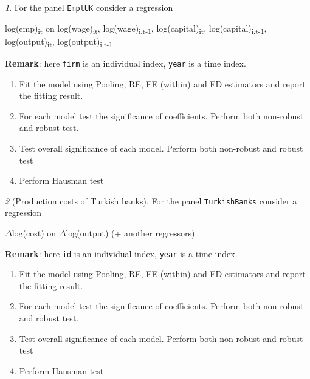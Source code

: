 \documentclass[12pt]{article}
\theoremstyle{remark}
\newtheorem{exercise}{}[section]
\begin{document}
\begin{exercise}
For the panel \texttt{EmplUK} consider a regression
\begin{center}
	log(emp)\textsubscript{it} on log(wage)\textsubscript{it}, log(wage)\textsubscript{i,t-1}, 
	log(capital)\textsubscript{it}, log(capital)\textsubscript{i,t-1},
	log(output)\textsubscript{it}, log(output)\textsubscript{i,t-1}  
\end{center}
\textbf{Remark}: here \texttt{firm} is an individual index, 
\texttt{year} is a time index.
\begin{enumerate}
	\item Fit the model using Pooling, RE, FE (within) and FD estimators
	and report the fitting result.
	\item For each model test the significance of coefficients. Perform both
	non-robust and robust test.
	\item Test overall significance of each model. Perform both
	non-robust and robust test
	\item Perform Hausman test
\end{enumerate}
\end{exercise}

\begin{exercise}[Production costs of Turkish banks]
For the panel \texttt{TurkishBanks} consider a regression
\begin{center}
	\(\Delta\)log(cost) on \(\Delta\)log(output) (+ another regressors)  
\end{center}
\textbf{Remark}: here \texttt{id} is an individual index, 
\texttt{year} is a time index.
\begin{enumerate}
	\item Fit the model using Pooling, RE, FE (within) and FD estimators
	and report the fitting result.
	\item For each model test the significance of coefficients. Perform both
	non-robust and robust test.
	\item Test overall significance of each model. Perform both
	non-robust and robust test
	\item Perform Hausman test
\end{enumerate}
\end{exercise}
\end{document}
